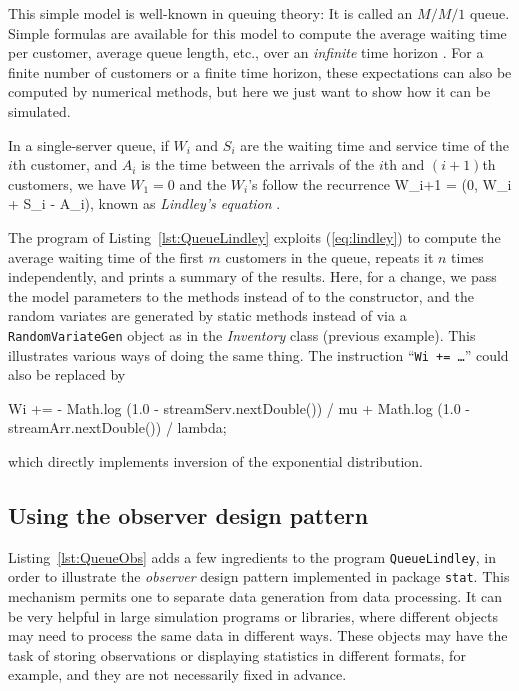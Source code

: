 This simple model is well-known in queuing theory: It is called
an $M/M/1$ queue.  Simple formulas are available for this model to
compute the average waiting time per customer, average queue length,
etc., over an {\em infinite\/} time horizon \cite{pKLE75a}.
For a finite number of customers or a finite time horizon,
these expectations can also be computed by numerical methods,
but here we just want to show how it can be simulated.

In a single-server queue,
if $W_i$ and $S_i$ are the waiting time and service time of the
$i$th customer, and $A_i$ is the time between the arrivals of
the $i$th and $(i+1)$th customers, we have $W_1=0$ and the $W_i$'s
follow the recurrence
\eq
  W_{i+1} = \max(0,\; W_i + S_i - A_i),               \label {eq:lindley}
\endeq
known as \emph{Lindley's equation} \cite {pKLE75a}.





The program of Listing~\ref{lst:QueueLindley} exploits (\ref{eq:lindley})
to compute the average waiting time of the first $m$ customers in
the queue, repeats it $n$ times independently, and prints a summary of
the results.
Here, for a change, we pass the model parameters to the methods
instead of to the constructor, and
the random variates are generated by static methods
instead of via a \texttt{RandomVariateGen} object as in the
\emph{Inventory} class (previous example).
This illustrates various ways of doing the same thing.
The instruction ``\texttt{Wi += \dots}'' could also be replaced by
\begin{code}
      Wi += - Math.log (1.0 - streamServ.nextDouble()) / mu
            + Math.log (1.0 - streamArr.nextDouble()) / lambda;
\end{code}
which directly implements inversion of the exponential distribution.



\subsection{Using the observer design pattern}
\label {sec:observer}

Listing~\ref{lst:QueueObs} adds a few ingredients to the program
\texttt{QueueLindley}, in order to illustrate the \emph{observer}
design pattern implemented in package \texttt{stat}.
This mechanism permits one to separate data generation from data
processing.  It can be very helpful in large simulation programs or
libraries, where different objects may need to process the same data
in different ways.  These objects may have the task of storing observations
or displaying statistics in different formats, for example, and they are
not necessarily fixed in advance.


